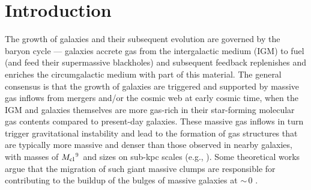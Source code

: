 \IfFileExists{emulateapjlegacy.cls}{\documentclass[iop]{emulateapjlegacy}}{\documentclass[iop]{emulateapj}}
\begin{document}

\def\figpath{./Fig}

\section{Introduction}    \label{sec:intro}

The growth of galaxies and their subsequent evolution are governed by the baryon cycle ---
galaxies accrete gas from the intergalactic medium (IGM) to fuel \SF (and feed their supermassive blackholes)
and subsequent feedback replenishes and enriches the circumgalactic medium with part of this material.
The general consensus is that the growth of \highz galaxies are triggered and supported by massive
gas inflows from mergers and/or the cosmic web at early cosmic time, when the IGM and galaxies themselves 
are more gas-rich in their star-forming molecular
gas contents compared to present-day galaxies.
These massive gas inflows in turn trigger gravitational instability and lead
to the formation of gas structures that are typically more massive and denser than those
observed in nearby galaxies, with masses of $M_{\rm cl}$$^9$\,\Msun
and sizes on sub-kpc scales (e.g., \citealt{Gabor13a, Hopkins14a, Inoue16a}).
Some theoretical works argue that the
migration of such giant massive clumps are responsible for contributing to the
buildup of the bulges of massive galaxies at \z$\sim$\,0 \citep[e.g.,][]{Ceverino10a}.
\end{document}
